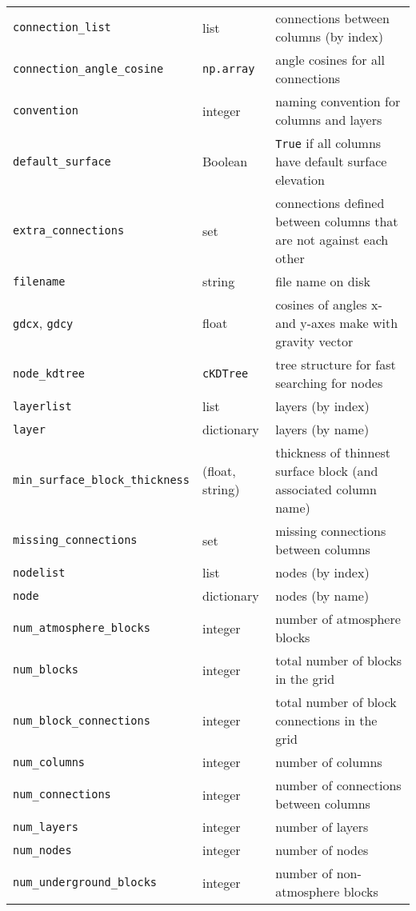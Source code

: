 \begin{center}
\begin{longtable}{|l|l|p{75mm}|}
    \texttt{connection\_list} & list & connections between columns (by index)\\
    \texttt{connection\_angle\_cosine} & \texttt{np.array} & angle cosines for all connections\\
    \texttt{convention} & integer & naming convention for columns and layers\\
    \texttt{default\_surface} & Boolean  & \texttt{True} if all columns have default surface elevation\\
    \texttt{extra\_connections} & set & connections defined between columns that are not against each other\\
    \texttt{filename} & string  & file name on disk\\
    \texttt{gdcx}, \texttt{gdcy} & float  & cosines of angles x- and y-axes make with gravity vector\\
    \texttt{node\_kdtree} & \texttt{cKDTree} & tree structure for fast searching for nodes \\
    \texttt{layerlist} & list & layers (by index)\\
    \texttt{layer} & dictionary & layers (by name)\\
    \texttt{min\_surface\_block\_thickness} & (float, string) & thickness of thinnest surface block (and associated column name)\\
    \texttt{missing\_connections} & set & missing connections between columns\\
    \texttt{nodelist} & list  & nodes (by index)\\
    \texttt{node} & dictionary  & nodes (by name)\\
    \texttt{num\_atmosphere\_blocks} & integer & number of atmosphere blocks\\
    \texttt{num\_blocks} & integer & total number of blocks in the grid\\
    \texttt{num\_block\_connections} & integer & total number of block connections in the grid\\
    \texttt{num\_columns} & integer & number of columns\\
    \texttt{num\_connections} & integer & number of connections between columns\\
    \texttt{num\_layers} & integer & number of layers\\
    \texttt{num\_nodes} & integer & number of nodes\\
    \texttt{num\_underground\_blocks} & integer & number of non-atmosphere blocks\\

\end{longtable}
\end{center}
